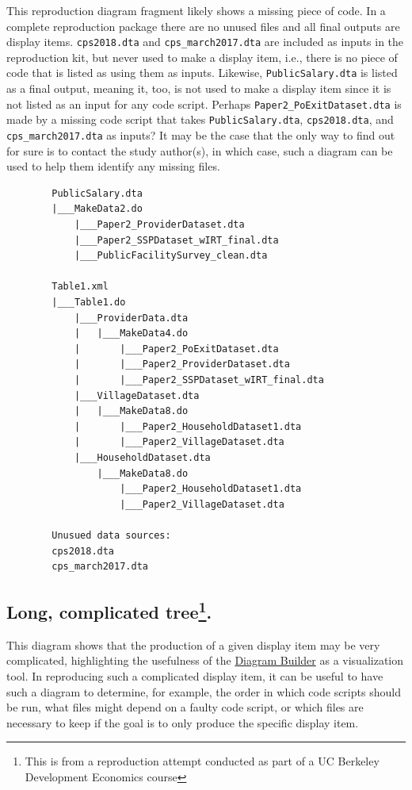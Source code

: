 \documentclass[
  openany]{book}
\begin{document}
This reproduction diagram fragment likely shows a missing piece of code. In a complete reproduction package there are no unused files and all final outputs are display items. \texttt{cps2018.dta} and \texttt{cps\_march2017.dta} are included as inputs in the reproduction kit, but never used to make a display item, i.e., there is no piece of code that is listed as using them as inputs. Likewise, \texttt{PublicSalary.dta} is listed as a final output, meaning it, too, is not used to make a display item since it is not listed as an input for any code script. Perhaps \texttt{Paper2\_PoExitDataset.dta} is made by a missing code script that takes \texttt{PublicSalary.dta}, \texttt{cps2018.dta}, and \texttt{cps\_march2017.dta} as inputs? It may be the case that the only way to find out for sure is to contact the study author(s), in which case, such a diagram can be used to help them identify any missing files.

\begin{verbatim}
        PublicSalary.dta
        |___MakeData2.do
            |___Paper2_ProviderDataset.dta
            |___Paper2_SSPDataset_wIRT_final.dta
            |___PublicFacilitySurvey_clean.dta

        Table1.xml
        |___Table1.do
            |___ProviderData.dta
            |   |___MakeData4.do
            |       |___Paper2_PoExitDataset.dta
            |       |___Paper2_ProviderDataset.dta
            |       |___Paper2_SSPDataset_wIRT_final.dta
            |___VillageDataset.dta
            |   |___MakeData8.do
            |       |___Paper2_HouseholdDataset1.dta
            |       |___Paper2_VillageDataset.dta
            |___HouseholdDataset.dta
                |___MakeData8.do
                    |___Paper2_HouseholdDataset1.dta
                    |___Paper2_VillageDataset.dta

        Unusued data sources:
        cps2018.dta
        cps_march2017.dta  
\end{verbatim}

\hypertarget{long-complicated-tree.}{%
\subsection[Long, complicated tree.]{\texorpdfstring{Long, complicated tree\footnote{This is from a reproduction attempt conducted as part of a UC Berkeley Development Economics course}.}{Long, complicated tree.}}\label{long-complicated-tree.}}

This diagram shows that the production of a given display item may be very complicated, highlighting the usefulness of the \protect\hyperlink{diagram}{Diagram Builder} as a visualization tool. In reproducing such a complicated display item, it can be useful to have such a diagram to determine, for example, the order in which code scripts should be run, what files might depend on a faulty code script, or which files are necessary to keep if the goal is to only produce the specific display item.
\end{document}
